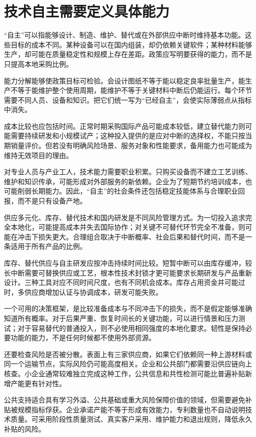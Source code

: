 \documentclass[UTF8,fontset=fandol,zihao=-4,oneside,openany]{ctexbook}
\begin{document}
\section{技术自主需要定义具体能力}
“自主”可以指能够设计、制造、维护、替代或在外部供应中断时维持基本功能。这些目标的成本不同。某种设备可以在国内组装，却仍依赖关键软件；某种材料能够生产，却可能在质量稳定性和规模上存在差距。政策应写明要获得的能力，而不是只提高本地采购比例。

\label{arg:P211}
能力分解能够使政策目标可检验。会设计图纸不等于能以稳定良率批量生产，能生产不等于能维护整个使用周期，能维护不等于关键材料中断后仍能运行。每个环节需要不同人员、设备和知识。把它们统一写为“已经自主”，会使实际薄弱点从指标中消失。

成本比较也应包括时间。正常时期采购国际产品可能成本较低，建立替代能力则可能需要持续研发和小规模试产；这种投入提供的是应对中断的选择权，不能只按当期销量评价。但若没有明确风险场景、服务对象和性能要求，备用能力也可能成为维持无效项目的理由。

对专业人员与产业工人，技术能力需要职业积累。只购买设备而不建立工艺训练、维护和知识传承，可能形成对外部服务的新依赖。企业为了短期节约培训成本，也可能削弱长期能力。因此，“自主”的社会条件还包括稳定技能体系与合理职业回报，而不是只有设备产地。

供应多元化、库存、替代技术和国内研发是不同风险管理方式。为一切投入追求完全本地化，可能提高成本并失去国际协作；对关键不可替代环节完全不准备，则可能在冲击下损失更大。合理组合取决于中断概率、社会后果和替代时间，而不是一条适用于所有产品的比例。

\label{arg:P212}
库存、替代供应与自主研发应按冲击持续时间比较。短暂中断可以由库存缓冲，较长中断需要可替换供应或工艺，根本性技术封锁才更可能要求长期研发与产品重新设计。三种工具对应不同时间尺度，也有不同机会成本。库存占用资金并可能过时，多供应商增加认证与协调成本，研发可能失败。

一个可用的决策框架，是比较准备成本与不同冲击下的损失，而不是假定能够准确知道所有概率。对于后果严重、恢复时间长的关键功能，可以进行情景和压力测试；对于容易替代的普通投入，则不必使用相同强度的本地化要求。韧性是保持必要功能的能力，不是任何时候都不使用外部资源。

还要检查风险是否被分散。表面上有三家供应商，如果它们依赖同一种上游材料或同一个运输节点，实际风险仍可能高度相关。企业和公共部门都需要沿供应链向上核查。小企业通常较难独立完成这种工作，公共信息和共性检测可能比普遍补贴新增产能更有针对性。

公共支持适合具有学习外溢、公共基础或重大风险保障价值的领域，但需要避免补贴被规模指标俘获。企业承诺产能不等于形成有效能力，专利数量也不自动说明技术质量。可采用阶段性质量测试、真实客户采用、维护能力和退出规则，降低永久补贴的风险。
\end{document}
